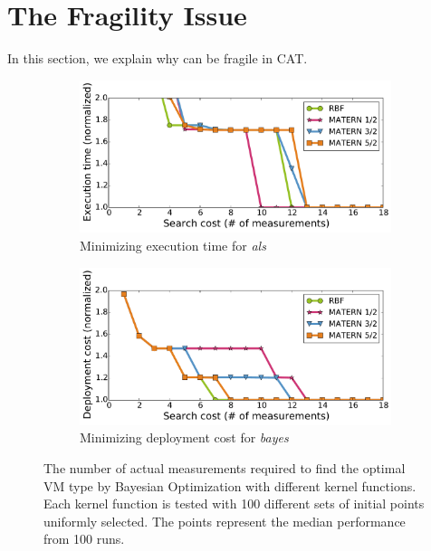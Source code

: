 \section{The Fragility Issue}
\label{sec:bo}

In this section, we explain why \bo can be fragile
in CAT.


\begin{figure}[!htbp]
\centering
\begin{subfigure}[b]{0.45\textwidth}
    \includegraphics[width=\linewidth]{figures/kernel_time_spark.als.large_new.pdf}
    \caption{Minimizing execution time for \emph{als}}
    \label{fig:cases_good}
\end{subfigure}
\hfill
\begin{subfigure}[b]{0.45\textwidth}
    \includegraphics[width=\linewidth]{figures/kernel_cost_spark.bayes.medium_new.pdf}
    \caption{Minimizing deployment cost for \emph{bayes}}
    \label{fig:cases_bad}
\end{subfigure}
\caption{The number of actual measurements required to find
 the optimal VM type by Bayesian Optimization
 with different kernel functions.  Each kernel function is tested
 with 100 different sets of initial points uniformly selected. The points represent the median performance from 100 runs.}
\label{fig:kernel_comparison}
\end{figure}


